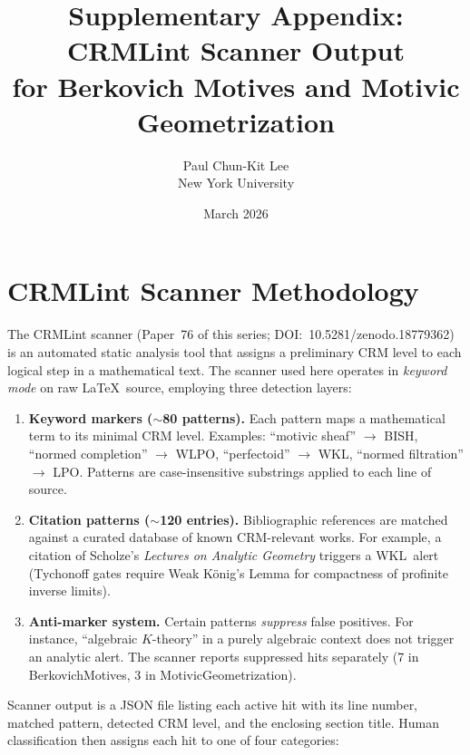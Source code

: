 \documentclass[11pt]{article}
\title{Supplementary Appendix: CRMLint Scanner Output\\
for Berkovich Motives and Motivic Geometrization}
\author{Paul Chun-Kit Lee\\
\small New York University}
\date{March 2026}
\newcommand{\BISH}{\textsf{BISH}}
\newcommand{\WKL}{\textsf{WKL}}
\newcommand{\WLPO}{\textsf{WLPO}}
\newcommand{\LPO}{\textsf{LPO}}
\begin{document}
\maketitle

\appendix
\section{CRMLint Scanner Methodology}
\label{sec:methodology}

The CRMLint scanner (Paper~76 of this series; DOI:~10.5281/zenodo.18779362) is an
automated static analysis tool that assigns a preliminary CRM level to each logical
step in a mathematical text.  The scanner used here operates in \emph{keyword mode}
on raw \LaTeX\ source, employing three detection layers:

\begin{enumerate}
\item \textbf{Keyword markers ($\sim$80 patterns).}
  Each pattern maps a mathematical term to its minimal CRM level.
  Examples: ``motivic sheaf'' $\to$ \BISH, ``normed completion'' $\to$ \WLPO,
  ``perfectoid'' $\to$ \WKL, ``normed filtration'' $\to$ \LPO.
  Patterns are case-insensitive substrings applied to each line of source.

\item \textbf{Citation patterns ($\sim$120 entries).}
  Bibliographic references are matched against a curated database of known
  CRM-relevant works.  For example, a citation of Scholze's
  \emph{Lectures on Analytic Geometry} triggers a \WKL\ alert (Tychonoff
  gates require Weak K\"onig's Lemma for compactness of profinite
  inverse limits).

\item \textbf{Anti-marker system.}
  Certain patterns \emph{suppress} false positives.
  For instance, ``algebraic $K$-theory'' in a purely algebraic context
  does not trigger an analytic alert.
  The scanner reports suppressed hits separately (7 in BerkovichMotives,
  3 in MotivicGeometrization).
\end{enumerate}

Scanner output is a JSON file listing each active hit with its line number,
matched pattern, detected CRM level, and the enclosing section title.
Human classification then assigns each hit to one of four categories:
\end{document}
